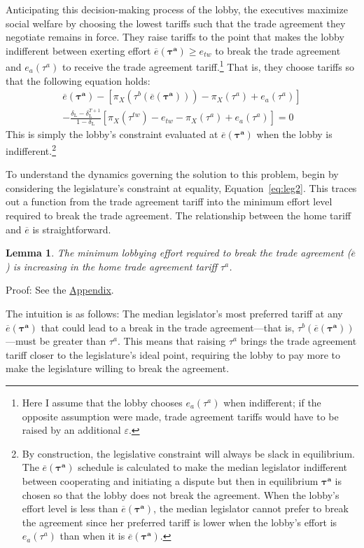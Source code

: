 \documentclass[authoryear, review]{elsarticle}
\newtheorem{lemma}{Lemma}
\newcommand{\ov}{\overline}
\newcommand{\bta}{\bm{\tau^a}}
\newcommand{\de}{\delta}
\begin{document}
Anticipating this decision-making process of the lobby, the executives maximize social welfare by choosing the lowest tariffs such that the trade agreement they negotiate remains in force. They raise tariffs to the point that makes the lobby indifferent between exerting effort $\ov{e}(\bta)\geq e_{tw}$ to break the trade agreement and $e_a(\tau^a)$ to receive the trade agreement tariff.\footnote{Here I assume that the lobby chooses $e_a(\tau^a)$ when indifferent; if the opposite assumption were made, trade agreement tariffs would have to be raised by an additional $\varepsilon$.} That is, they choose tariffs so that the following equation holds:
\begin{multline}
  \ov{e}(\bta) - \left[ \pi_X(\tau^b(\ov{e}(\bta))) - \pi_X(\tau^a) + e_a(\tau^a)\right] \\
	- \frac{\de_\text{L} - \de_\text{L}^{T+1}}{1-\de_\text{L}} \left[\pi_X(\tau^{tw}) -e_{tw} - \pi_X(\tau^a) + e_a(\tau^a) \right] = 0
  \label{eq:lob2}
\end{multline}
This is simply the lobby's constraint evaluated at $\ov{e}(\bta)$ when the lobby is indifferent.\footnote{By construction, the legislative constraint will always be slack in equilibrium. The $\ov{e}(\bta)$ schedule is calculated to make the median legislator indifferent between cooperating and initiating a dispute but then in equilibrium $\bta$ is chosen so that the lobby does not break the agreement. When the lobby's effort level is less than $\ov{e}(\bta)$, the median legislator cannot prefer to break the agreement since her preferred tariff is lower when the lobby's effort is $e_a(\tau^a)$ than when it is $\ov{e}(\bta)$.}

To understand the dynamics governing the solution to this problem, begin by considering the legislature's constraint at equality, Equation~\ref{eq:leg2}. This traces out a function from the trade agreement tariff into the minimum effort level required to break the trade agreement. The relationship between the home tariff and $\ov{e}$ is straightforward. 
\begin{lemma}
  The minimum lobbying effort required to break the trade agreement ($\ov{e}$) is increasing in the home trade agreement tariff $\tau^a$.
  \label{lem:et}
\end{lemma}
Proof: See the \hyperlink{Cor_et}{Appendix}.

\noindent The intuition is as follows: The median legislator's most preferred tariff at any $\ov{e}(\bta)$ that could lead to a break in the trade agreement---that is, $\tau^b\left(\ov{e}(\bta)\right)$---must be greater than $\tau^a$. This means that raising $\tau^a$ brings the trade agreement tariff closer to the legislature's ideal point, requiring the lobby to pay more to make the legislature willing to break the agreement.
\end{document}
